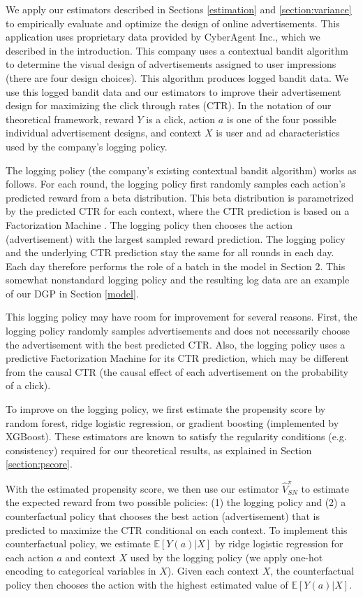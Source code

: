 \documentclass[letterpaper]{article} \usepackage{aaai19}  \usepackage{times}  \usepackage{helvet}  \usepackage{courier}  \usepackage{url}  \usepackage{graphicx}  \frenchspacing  \usepackage{comment}
\newcommand{\citep}{\cite}
\begin{document}
We apply our estimators described in Sections \ref{estimation} and \ref{section:variance} to empirically evaluate and optimize the design of online advertisements. 
This application uses proprietary data provided by CyberAgent Inc., which we described in the introduction. 
This company uses a contextual bandit algorithm to determine the visual design of advertisements assigned to user impressions (there are four design choices). 
This algorithm produces logged bandit data. 
We use this logged bandit data and our estimators to improve their advertisement design for maximizing the click through rates (CTR). 
In the notation of our theoretical framework, reward $Y$ is a click, action $a$ is one of the four possible individual advertisement designs, and context $X$ is user and ad characteristics used by the company's logging policy. 

The logging policy (the company's existing contextual bandit algorithm) works as follows. 
For each round, the logging policy first randomly samples each action's predicted reward from a beta distribution. 
This beta distribution is parametrized by the predicted CTR for each context, where the CTR prediction is based on a Factorization Machine \citep{rendle2010factorization}. 
The logging policy then chooses the action (advertisement) with the largest sampled reward prediction. 
The logging policy and the underlying CTR prediction stay the same for all rounds in each day. 
Each day therefore performs the role of a batch in the model in Section 2. 
This somewhat nonstandard logging policy and the resulting log data are an example of our DGP in Section \ref{model}. 

This logging policy may have room for improvement for several reasons. 
First, the logging policy randomly samples advertisements and does not necessarily choose the advertisement with the best predicted CTR. 
Also, the logging policy uses a predictive Factorization Machine for its CTR prediction, which may be different from the causal CTR (the causal effect of each advertisement on the probability of a click). 

To improve on the logging policy, we first estimate the propensity score by random forest, ridge logistic regression, or gradient boosting (implemented by XGBoost). 
These estimators are known to satisfy the regularity conditions (e.g. consistency) required for our theoretical results, as explained in Section \ref{section:pscore}. 

With the estimated propensity score, we then use our estimator $\hat V^{\pi}_{SN}$ to estimate the expected reward from two possible policies: 
(1) the logging policy and (2) a counterfactual policy that chooses the best action (advertisement) that is predicted to maximize the CTR conditional on each context. 
To implement this counterfactual policy, we estimate $\mathbb{E}[Y(a)|X]$ by ridge logistic regression for each action $a$ and context $X$ used by the logging policy (we apply one-hot encoding to categorical variables in $X$). 
Given each context $X$, the counterfactual policy then chooses the action with the highest estimated value of $\mathbb{E}[Y(a)|X]$.
\end{document}
